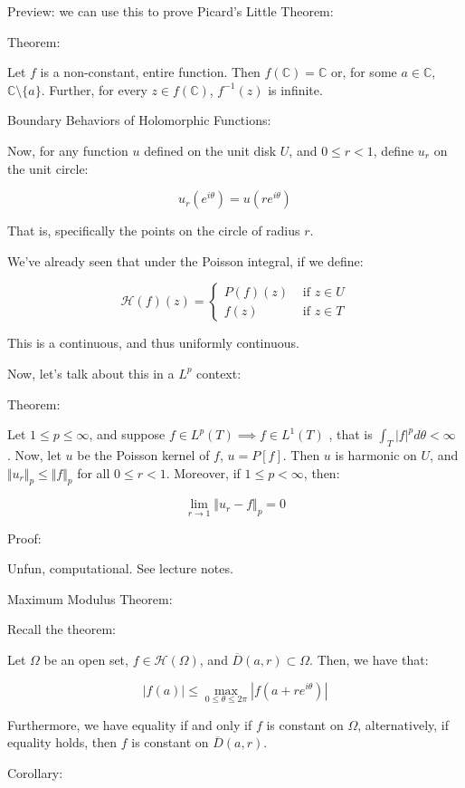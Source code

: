 \documentclass[10pt]{article}
\newcommand{\calH}{\mathcal{H}}
\begin{document}
Preview: we can use this to prove Picard’s Little Theorem:

Theorem:

Let $f$ is a non-constant, entire function. Then $f(\mathbb{C}) = \mathbb{C}$ or, for some $a \in \mathbb{C}$, $\mathbb{C} \setminus \{ a \}$.  Further, for every $z \in f(\mathbb{C})$, $f^{-1}(z)$ is infinite. 

Boundary Behaviors of Holomorphic Functions:

Now, for any function $u$ defined on the unit disk $U$, and $0 \leq r < 1$, define $u_r$ on the unit circle:

$$u_r(e^{i\theta}) = u(r e^{i\theta})$$

That is, specifically the points on the circle of radius $r$.

We’ve already seen that under the Poisson integral, if we define:

$$\calH(f)(z) = \begin{cases} P(f)(z) & \text{ if } z \in U \\ f(z) & \text{ if } z \in T \end{cases}$$

This is a continuous, and thus uniformly continuous.

Now, let’s talk about this in a $L^p$ context:

Theorem:

Let $1 \leq p \leq \infty$, and suppose $f \in L^p(T) \implies f \in L^1(T)$ , that is $\int_T |f|^p d\theta < \infty$ . Now, let $u$ be the Poisson kernel of $f$, $u = P[f]$. Then $u$ is harmonic on $U$, and $\Vert u_r \Vert_p \leq \Vert f \Vert_p$ for all $0 \leq r < 1$. Moreover, if $1 \leq p < \infty$, then:

$$ \lim_{r \to 1} \Vert u_r - f \Vert_p = 0$$

Proof:

Unfun, computational. See lecture notes.

Maximum Modulus Theorem:

Recall the theorem:

Let $\Omega$ be an open set, $f \in \calH(\Omega)$, and $\overline{D}(a,r) \subset \Omega$. Then, we have that:

$$|f(a) | \leq \max_{0 \leq \theta \leq 2\pi} | f(a + re^{i\theta})| $$

Furthermore, we have equality if and only if $f$ is constant on $\Omega$, alternatively, if equality holds, then $f$ is constant on $\overline{D}(a,r)$. 

Corollary:
\end{document}
